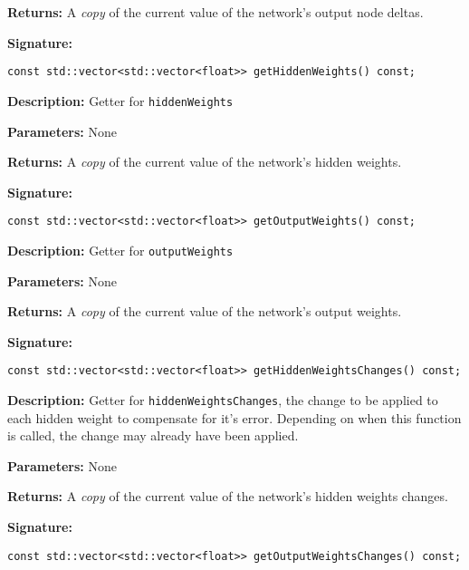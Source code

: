 \documentclass[a4paper]{article}
\begin{document}
\textbf{Returns: }
A \textit{copy} of the current value of the network's output node deltas.

\hrulefill %

\textbf{Signature:} \begin{lstlisting}
const std::vector<std::vector<float>> getHiddenWeights() const;
\end{lstlisting}

\textbf{Description: }
Getter for \lstinline{hiddenWeights}

\textbf{Parameters: } None

\textbf{Returns: }
A \textit{copy} of the current value of the network's hidden weights.

\hrulefill %

\textbf{Signature:} \begin{lstlisting}
const std::vector<std::vector<float>> getOutputWeights() const;
\end{lstlisting}

\textbf{Description: }
Getter for \lstinline{outputWeights}

\textbf{Parameters: } None

\textbf{Returns: }
A \textit{copy} of the current value of the network's output weights.

\hrulefill %

\textbf{Signature:} \begin{lstlisting}
const std::vector<std::vector<float>> getHiddenWeightsChanges() const;
\end{lstlisting}

\textbf{Description: }
Getter for \lstinline{hiddenWeightsChanges}, the change to be applied to each hidden weight to compensate for it's error. Depending on when this function is called, the change may already have been applied.

\textbf{Parameters: } None

\textbf{Returns: }
A \textit{copy} of the current value of the network's hidden weights changes.

\hrulefill %

\textbf{Signature:} \begin{lstlisting}
const std::vector<std::vector<float>> getOutputWeightsChanges() const;
\end{lstlisting}
\end{document}
